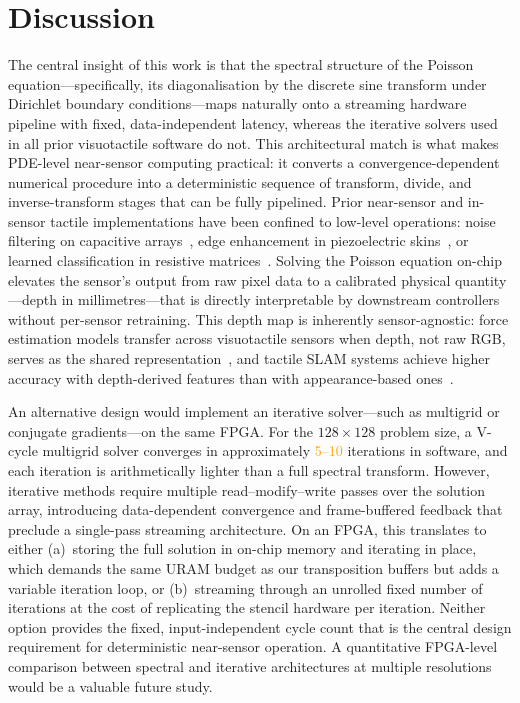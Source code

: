 \documentclass[10pt,a4paper]{article}
\newcommand{\placeholder}[1]{\textcolor{orange}{#1}}
\begin{document}
\section*{Discussion} 

The central insight of this work is that the spectral structure of the Poisson equation---specifically, its diagonalisation by the discrete sine transform under Dirichlet boundary conditions---maps naturally onto a streaming hardware pipeline with fixed, data-independent latency, whereas the iterative solvers used in all prior visuotactile software do not. This architectural match is what makes PDE-level near-sensor computing practical: it converts a convergence-dependent numerical procedure into a deterministic sequence of transform, divide, and inverse-transform stages that can be fully pipelined. Prior near-sensor and in-sensor tactile implementations have been confined to low-level operations: noise filtering on capacitive arrays~\cite{chen2025capacitive}, edge enhancement in piezoelectric skins~\cite{cho2025npjflex}, or learned classification in resistive matrices~\cite{zhou2020nearsensor}. Solving the Poisson equation on-chip elevates the sensor's output from raw pixel data to a calibrated physical quantity---depth in millimetres---that is directly interpretable by downstream controllers without per-sensor retraining. This depth map is inherently sensor-agnostic: force estimation models transfer across visuotactile sensors when depth, not raw RGB, serves as the shared representation~\cite{chen2026genforce}, and tactile SLAM systems achieve higher accuracy with depth-derived features than with appearance-based ones~\cite{zhao2026gelslam}.

An alternative design would implement an iterative solver---such as multigrid or conjugate gradients---on the same FPGA. For the $128 \times 128$ problem size, a V-cycle multigrid solver converges in approximately \placeholder{5--10} iterations in software, and each iteration is arithmetically lighter than a full spectral transform. However, iterative methods require multiple read--modify--write passes over the solution array, introducing data-dependent convergence and frame-buffered feedback that preclude a single-pass streaming architecture. On an FPGA, this translates to either (a)~storing the full solution in on-chip memory and iterating in place, which demands the same URAM budget as our transposition buffers but adds a variable iteration loop, or (b)~streaming through an unrolled fixed number of iterations at the cost of replicating the stencil hardware per iteration. Neither option provides the fixed, input-independent cycle count that is the central design requirement for deterministic near-sensor operation. A quantitative FPGA-level comparison between spectral and iterative architectures at multiple resolutions would be a valuable future study.
\end{document}
